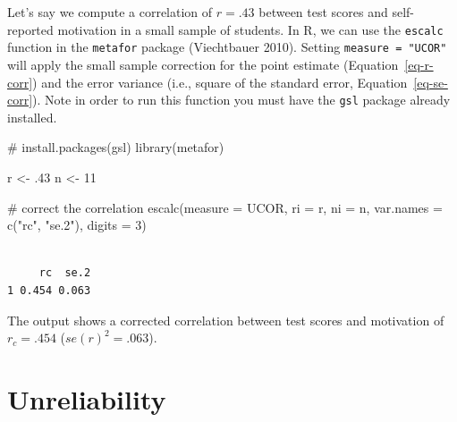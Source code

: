 \documentclass[
  letterpaper,
  DIV=11,
  numbers=noendperiod]{scrreprt}
\newenvironment{Shaded}{}{}
\newcommand{\AttributeTok}[1]{\textcolor[rgb]{0.00,0.34,0.68}{#1}}
\newcommand{\CommentTok}[1]{\textcolor[rgb]{0.54,0.53,0.53}{#1}}
\newcommand{\DecValTok}[1]{\textcolor[rgb]{0.69,0.50,0.00}{#1}}
\newcommand{\FunctionTok}[1]{\textcolor[rgb]{0.39,0.29,0.61}{#1}}
\newcommand{\NormalTok}[1]{\textcolor[rgb]{0.12,0.11,0.11}{#1}}
\newcommand{\OtherTok}[1]{\textcolor[rgb]{0.00,0.43,0.16}{#1}}
\newcommand{\StringTok}[1]{\textcolor[rgb]{0.75,0.01,0.01}{#1}}
\begin{document}
\begin{tcolorbox}[enhanced jigsaw, toptitle=1mm, titlerule=0mm, arc=.35mm, breakable, colframe=quarto-callout-note-color-frame, title={Applied Example in R}, opacitybacktitle=0.6, opacityback=0, colbacktitle=quarto-callout-note-color!10!white, coltitle=black, bottomtitle=1mm, colback=white, bottomrule=.15mm, rightrule=.15mm, toprule=.15mm, leftrule=.75mm, left=2mm]

Let's say we compute a correlation of \(r=.43\) between test scores and
self-reported motivation in a small sample of students. In R, we can use
the \texttt{escalc} function in the \texttt{metafor} package
(Viechtbauer 2010). Setting \texttt{measure\ =\ "UCOR"} will apply the
small sample correction for the point estimate
(Equation~\ref{eq-r-corr}) and the error variance (i.e., square of the
standard error, Equation~\ref{eq-se-corr}). Note in order to run this
function you must have the \texttt{gsl} package already installed.

\begin{Shaded}
\begin{Highlighting}[]
\CommentTok{\# install.packages(\textquotesingle{}gsl\textquotesingle{})}
\FunctionTok{library}\NormalTok{(metafor)}

\NormalTok{r }\OtherTok{\textless{}{-}}\NormalTok{ .}\DecValTok{43}
\NormalTok{n }\OtherTok{\textless{}{-}} \DecValTok{11}

\CommentTok{\# correct the correlation}
\FunctionTok{escalc}\NormalTok{(}\AttributeTok{measure =} \StringTok{\textquotesingle{}UCOR\textquotesingle{}}\NormalTok{,}
       \AttributeTok{ri =}\NormalTok{ r,}
       \AttributeTok{ni =}\NormalTok{ n,}
       \AttributeTok{var.names =} \FunctionTok{c}\NormalTok{(}\StringTok{"rc"}\NormalTok{, }\StringTok{"se.2"}\NormalTok{),}
       \AttributeTok{digits =} \DecValTok{3}\NormalTok{)}
\end{Highlighting}
\end{Shaded}

\begin{verbatim}

     rc  se.2 
1 0.454 0.063 
\end{verbatim}

The output shows a corrected correlation between test scores and
motivation of \(r_c=.454\) (\(se(r)^2=.063\)).

\end{tcolorbox}

\hypertarget{unreliability}{%
\chapter{Unreliability}\label{unreliability}}
\end{document}
